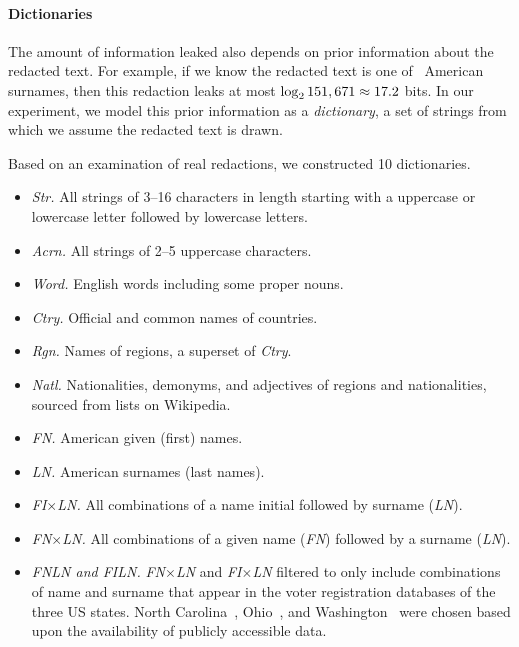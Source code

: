 \paragraph{Dictionaries}
The amount of information leaked also depends on prior information about the redacted text. 
For example, if we know the redacted text is one of \neltln\ American surnames, then this redaction leaks at most $\log_2 151,671 \approx 17.2$ bits.
In our experiment, we model this prior information as a \emph{dictionary}, a set of strings from which we assume the redacted text is drawn.

Based on an examination of real redactions, we constructed 10 dictionaries.

\begin{itemize}[nosep]
\item\textit{Str.} All strings of 3--16 characters in length starting with a uppercase or lowercase letter followed by lowercase letters.
\item\textit{Acrn.} All strings of 2--5 uppercase characters.
\item\textit{Word.} English words including some proper nouns.
\item\textit{Ctry.} Official and common names of countries.
\item\textit{Rgn.} Names of regions, a superset of \emph{Ctry}.
\item\textit{Natl.} Nationalities, demonyms, and adjectives of regions and nationalities, sourced from lists on Wikipedia.
\item\textit{FN.} American given (first) names.
\item\textit{LN.} American surnames (last names).
\item\textit{FI$\times$LN.} All combinations of a name initial followed by surname (\emph{LN}).
\item\textit{FN$\times$LN.} All combinations of a given name (\emph{FN}) followed by a surname (\emph{LN}).
\item\textit{FNLN and FILN.} \emph{FN$\times$LN} and \emph{FI$\times$LN} filtered to only include combinations of name and surname that appear in the voter registration databases of the three US states.
    North Carolina~\cite{ncVoterData}, Ohio~\cite{ohVoterData}, and Washington~\cite{waVoterData} were chosen based upon the availability of publicly accessible data.
\end{itemize}

